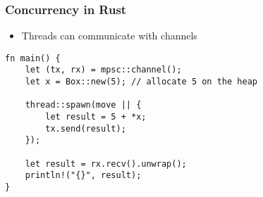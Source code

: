 \documentclass{beamer} %
\begin{document}
\begin{frame}[fragile]
\frametitle{Concurrency in Rust}

\begin{itemize}
    \item Threads can communicate with channels
\end{itemize}

\begin{lstlisting}
fn main() {
    let (tx, rx) = mpsc::channel();
    let x = Box::new(5); // allocate 5 on the heap
    
    thread::spawn(move || {
        let result = 5 + *x;
        tx.send(result);
    });
    
    let result = rx.recv().unwrap();
    println!("{}", result);
}
\end{lstlisting}

\end{frame}

   



\end{document}
